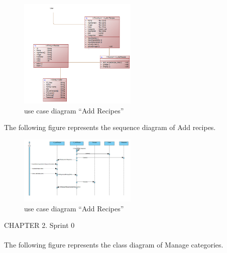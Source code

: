 \documentclass{article}
\begin{document}
{{{\begin{figure}[htbp]
    \centering
    \includegraphics[width=0.5\textwidth]{DiagAddRecipe}
    \caption{use case diagram “Add Recipes”}
    \label{fig:design2}
\end{figure}
The following figure represents the sequence diagram of Add recipes.\\
\begin{figure}[htbp]
    \centering
    \includegraphics[width=0.5\textwidth]{SeqAddRecipe}
    \caption{use case diagram “Add Recipes”}
    \label{fig:design2}
\end{figure}
\newpage
\noindent
CHAPTER 2.  Sprint 0 \\
\underline{\hspace{\textwidth}} \vspace{0.2cm}\\
The following figure represents the class diagram of Manage categories.\\

}}}
\end{document}
